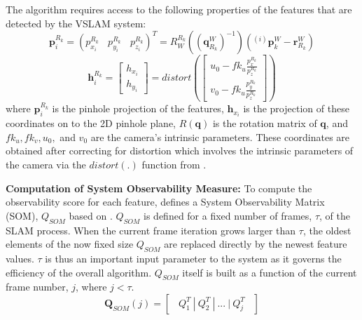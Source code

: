 \documentclass[10pt,twocolumn,letterpaper]{article}
\begin{document}
The algorithm requires access to the following properties of the features that are detected by the VSLAM system: 
\begin{equation} \label{eq:featureProjection}
\boldsymbol{p}_{i}^{R_k} = ({p}_{x_i}^{R_k} \ \ \ \  {p}_{y_i}^{R_k}  \ \ \ \  {p}_{z_i}^{R_k})^T = R^{R_k}_{W}((\boldsymbol{q}^{W}_{R_k})^{-1})(^{(i)}\boldsymbol{p}^{W}_{k} - \boldsymbol{r}^{W}_{R_k})
\end{equation}
\begin{equation} \label{eq:featureProjection2}
\boldsymbol{h}_{i}^{R_k} = \begin{bmatrix} {h}_{x_i} \\ {h}_{y_i} \end{bmatrix} = distort(\begin{bmatrix}
u_0 - fk_u\frac{p_x^{R_k}}{p_z^{R_k}}\\
v_0 - fk_u\frac{p_y^{R_k}}{p_z^{R_k}}
\end{bmatrix})
\end{equation}
where $\boldsymbol{p}_{i}^{R_k}$ is the pinhole projection of the features,  
$\boldsymbol{h}_{x_i}$ is the projection of these coordinates on to the 2D pinhole plane, $R(\boldsymbol{q})$ is the rotation matrix of $\boldsymbol{q}$, and $fk_u, fk_v, u_0,$ and $v_0$ are the camera's intrinsic parameters.
These coordinates are obtained after correcting for distortion which involves the intrinsic parameters of the camera via the $distort(.)$ function from \cite{distort}.

\textbf{Computation of System Observability Measure:} To compute the observability score for each feature,
\cite{Zhang_2015_CVPR} defines a System Observability Matrix (SOM), ${Q}_{SOM}$ based on \cite{gf15}. ${Q}_{SOM}$ is defined for a fixed number 
of frames, $\tau$, of the SLAM process. When the current frame iteration grows larger than $\tau$, the oldest
 elements of the now fixed size ${Q}_{SOM}$ are replaced directly by the newest feature values. $\tau$ is 
 thus an important input parameter to the system as it governs the efficiency of the overall algorithm. 
 ${Q}_{SOM}$ itself is built as a function of the current frame number, $j$, where 
 $j<\tau$.
\begin{equation} \label{eq:qsom}
\boldsymbol{Q}_{SOM}(j) = \begin{bmatrix} \ \ Q_1^T \ | \ Q_2^T \ | \ ... \ | \ Q_j^T  \ \ \end{bmatrix}
\end{equation}
\end{document}
